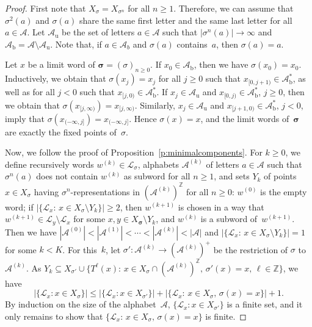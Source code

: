 \documentclass{amsart}
\theoremstyle{definition}
\theoremstyle{remark}
\numberwithin{equation}{section}
\begin{document}
\begin{proof}
First note that $X_\sigma = X_{\sigma^n}$ for all $n \ge 1$.
Therefore, we can assume that $\sigma^2(a)$ and $\sigma(a)$ share the same first letter and the same last letter for all $a \in \mathcal{A}$.
Let $\mathcal{A}_\mathrm{u}$ be the set of letters $a \in \mathcal{A}$ such that $|\sigma^n(a)| \to \infty$ and $\mathcal{A}_\mathrm{b} = \mathcal{A} \setminus \mathcal{A}_\mathrm{u}$.
Note that, if $a \in \mathcal{A}_b$ and $\sigma(a)$ contains~$a$, then $\sigma(a) = a$. 

Let $x$ be a limit word of $\boldsymbol{\sigma} = (\sigma)_{n\ge0}$.
If $x_0 \in \mathcal{A}_\mathrm{b}$, then we have $\sigma(x_0) = x_0$. 
Inductively, we obtain that $\sigma(x_j) = x_j$ for all $j \ge 0$ such that $x_{[0,j+1)} \in \mathcal{A}_\mathrm{b}^*$, as well as for all $j < 0$ such that $x_{[j,0)} \in \mathcal{A}_\mathrm{b}^*$. 
If $x_j \in \mathcal{A}_\mathrm{u}$ and $x_{[0,j)} \in \mathcal{A}_\mathrm{b}^*$, $j \ge 0$, then we obtain that $\sigma(x_{[j,\infty)}) = x_{[j,\infty)}$. 
Similarly, $x_j \in \mathcal{A}_\mathrm{u}$ and $x_{[j+1,0)} \in \mathcal{A}_\mathrm{b}^*$, $j < 0$, imply that $\sigma(x_{(-\infty,j]}) = x_{(-\infty,j]}$.
Hence $\sigma(x) = x$, and the limit words of~$\boldsymbol{\sigma}$ are exactly the fixed points of~$\sigma$. 

Now, we follow the proof of Proposition~\ref{p:minimalcomponents}. 
For $k \ge 0$, we define recursively words $w^{(k)} \in \mathcal{L}_\sigma$, alphabets $\mathcal{A}^{(k)}$ of letters $a \in \mathcal{A}$ such that $\sigma^n(a)$ does not contain $w^{(k)}$ as subword for all $n \ge 1$, and sets $Y_k$ of points $x \in X_\sigma$ having $\sigma^n$-representations in $(\mathcal{A}^{(k)})^\mathbb{Z}$ for all $n\ge0$: $w^{(0)}$ is the empty word; if $|\{\mathcal{L}_x:\, x \in X_\sigma \setminus Y_k\}| \ge 2$, then $w^{(k+1)}$ is chosen in a way that $w^{(k+1)} \in \mathcal{L}_y \setminus \mathcal{L}_x$ for some $x, y \in X_{\boldsymbol{\sigma}} \setminus Y_k$, and $w^{(k)}$ is a subword of~$w^{(k+1)}$. 
Then we have $|\mathcal{A}^{(0)}| < |\mathcal{A}^{(1)}| < \cdots < |\mathcal{A}^{(k)}| < |\mathcal{A}|$ and $|\{\mathcal{L}_x:\, x \in X_\sigma \setminus Y_k\}| = 1$ for some $k < K$.
For this~$k$, let $\sigma': \mathcal{A}^{(k)} \to (\mathcal{A}^{(k)})^+$ be the restriction of $\sigma$ to~$\mathcal{A}^{(k)}$.
As $Y_k \subseteq X_{\sigma'} \cup \{T^\ell(x):\, x \in X_\sigma \cap (\mathcal{A}^{(k)})^\mathbb{Z},\, \sigma'(x) = x,\, \ell \in \mathbb{Z}\}$, we have
\[
|\{\mathcal{L}_x: x \in X_\sigma\}| \le |\{\mathcal{L}_x: x \in X_{\sigma'}\}| + |\{\mathcal{L}_x:\, x \in X_\sigma,\, \sigma(x) = x\}| + 1.
\]
By induction on the size of the alphabet~$\mathcal{A}$, $\{\mathcal{L}_x: x \in X_{\sigma'}\}$ is a finite set, and it only remains to show that $\{\mathcal{L}_x:\, x \in X_\sigma,\, \sigma(x) = x\}$ is finite. 


\end{proof}
\end{document}
